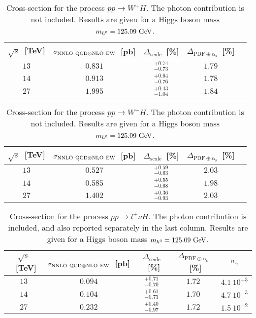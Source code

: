 \begin{table}
\centering
\begin{tabular}{ccccc}%
\toprule
$\sqrt{s}$~[TeV] & $\sigma_{{\rm NNLO~QCD}\otimes{\rm NLO~EW}}$~[pb] & $\Delta_{\mathrm{scale}}$~[\%] &
$\Delta_{\mathrm{PDF\oplus\alpha_s}}$~[\%] \\
\midrule
$13$ & $0.831$ & $^{+0.74}_{-0.73}$ & $1.79$ \\
$14$ & $0.913$ & $^{+0.64}_{-0.76}$ & $1.78$ \\
$27$ & $1.995$ & $^{+0.43}_{-1.04}$ & $1.84$ \\
\bottomrule
\end{tabular}%
\caption{Cross-section for the process $p p \to W^+H$. 
The photon contribution is not included. Results are given for a Higgs boson mass $m_{h^0} = 125.09~{\rm GeV}$.}
\label{tab:w+h_xsec}
\end{table}

\begin{table}
\centering
\begin{tabular}{ccccc}%
\toprule
$\sqrt{s}$~[TeV] & $\sigma_{{\rm NNLO~QCD}\otimes{\rm NLO~EW}}$~[pb] & $\Delta_{\mathrm{scale}}$~[\%] &
$\Delta_{\mathrm{PDF\oplus\alpha_s}}$~[\%] \\
\midrule
$13$ & $0.527$ & $^{+0.59}_{-0.63}$ & $2.03$ \\
$14$ & $0.585$ & $^{+0.55}_{-0.68}$ & $1.98$ \\
$27$ & $1.402$ & $^{+0.36}_{-0.93}$ & $2.03$ \\
\bottomrule
\end{tabular}%
\caption{Cross-section for the process $p p \to W^-H$. 
The photon contribution is not included. Results are given for a Higgs boson mass $m_{h^0} = 125.09~{\rm GeV}$.}
\label{tab:w-h_xsec}
\end{table}

\begin{table}
\centering
\begin{tabular}{cccc|c}%
\toprule
$\sqrt{s}$~[TeV] & $\sigma_{{\rm NNLO~QCD}\otimes{\rm NLO~EW}}$~[pb] & $\Delta_{\mathrm{scale}}$~[\%] &
$\Delta_{\mathrm{PDF\oplus\alpha_s}}$~[\%] & $\sigma_\gamma$\\
\midrule
$13$ & $0.094$ & $^{+0.71}_{-0.70}$ & $1.72$ & $4.1~10^{-3}$\\
$14$ & $0.104$ & $^{+0.61}_{-0.73}$ & $1.70$ & $4.7~10^{-3}$\\
$27$ & $0.232$ & $^{+0.40}_{-0.97}$ & $1.72$ & $1.5~10^{-2}$\\
\bottomrule
\end{tabular}%
\caption{Cross-section for the process $p p \to l^+\nu H$. 
The photon contribution is included, and also reported separately in the last column. 
Results are given for a Higgs boson mass $m_{h^0} = 125.09~{\rm GeV}$.}
\label{tab:l+nuh_xsec}
\end{table}

